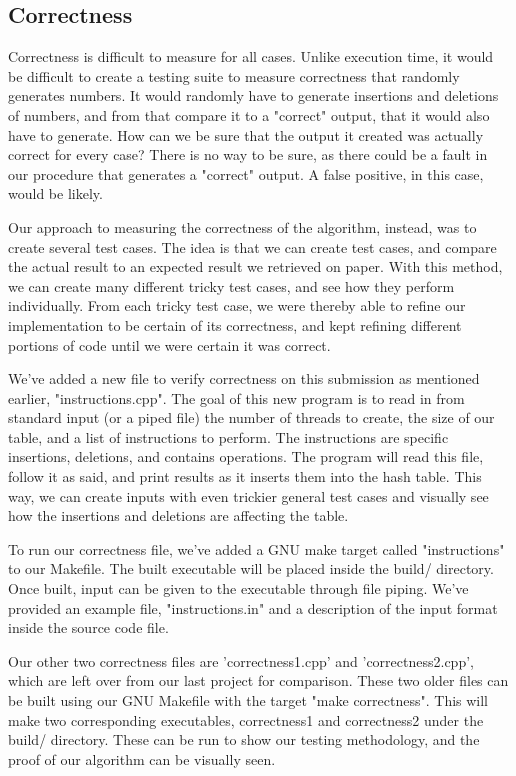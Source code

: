 \documentclass[journal]{IEEEtran}
\begin{document}
\subsection{Correctness}

Correctness is difficult to measure for all cases. Unlike execution time, it would be difficult to create a testing suite to measure correctness that randomly generates numbers. It would randomly have to generate insertions and deletions of numbers, and from that compare it to a "correct" output, that it would also have to generate. How can we be sure that the output it created was actually correct for every case? There is no way to be sure, as there could be a fault in our procedure that generates a "correct" output. A false positive, in this case, would be likely.

Our approach to measuring the correctness of the algorithm, instead, was to create several test cases. The idea is that we can create test cases, and compare the actual result to an expected result we retrieved on paper. With this method, we can create many different tricky test cases, and see how they perform individually. From each tricky test case, we were thereby able to refine our implementation to be certain of its correctness, and kept refining different portions of code until we were certain it was correct.

We've added a new file to verify correctness on this submission as mentioned earlier, "instructions.cpp". The goal of this new program is to read in from standard input (or a piped file) the number of threads to create, the size of our table, and a list of instructions to perform. The instructions are specific insertions, deletions, and contains operations. The program will read this file, follow it as said, and print results as it inserts them into the hash table. This way, we can create inputs with even trickier general test cases and visually see how the insertions and deletions are affecting the table.

To run our correctness file, we've added a GNU make target called "instructions" to our Makefile. The built executable will be placed inside the build/ directory. Once built, input can be given to the executable through file piping. We've provided an example file, "instructions.in" and a description of the input format inside the source code file.

Our other two correctness files are 'correctness1.cpp' and 'correctness2.cpp', which are left over from our last project for comparison. These two older files can be built using our GNU Makefile with the target "make correctness". This will make two corresponding executables, correctness1 and correctness2 under the build/ directory. These can be run to show our testing methodology, and the proof of our algorithm can be visually seen.
\end{document}
